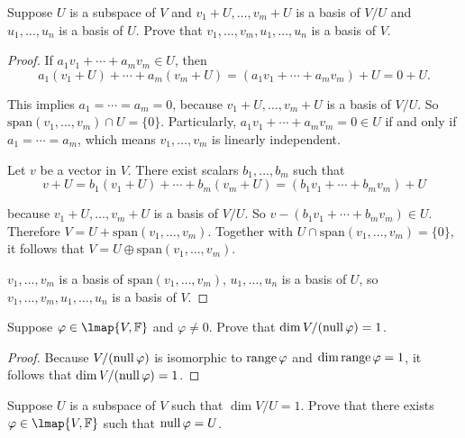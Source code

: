 \begin{exercise}
    Suppose $U$ is a subspace of $V$ and $v_{1} + U, \ldots, v_{m} + U$ is a basis of $V/U$ and $u_{1} , \ldots, u_{n}$ is a basis of $U$. Prove that $v_{1} , \ldots, v_{m} , u_{1} , \ldots, u_{n}$ is a basis of $V$.
\end{exercise}

\begin{proof}
    If $a_{1}v_{1} + \cdots + a_{m}v_{m} \in U$, then
    \[
        a_{1}(v_{1} + U) + \cdots + a_{m}(v_{m} + U) = (a_{1}v_{1} + \cdots + a_{m}v_{m}) + U = 0 + U.
    \]

    This implies $a_{1} = \cdots = a_{m} = 0$, because $v_{1} + U, \ldots, v_{m} + U$ is a basis of $V/U$. So $\text{span}(v_{1}, \ldots, v_{m})\cap U = \{0\}$. Particularly, $a_{1}v_{1} + \cdots + a_{m}v_{m} = 0\in U$ if and only if $a_{1} = \cdots = a_{m}$, which means $v_{1}, \ldots, v_{m}$ is linearly independent.

    Let $v$ be a vector in $V$. There exist scalars $b_{1}, \ldots, b_{m}$ such that
    \[
        v + U = b_{1}(v_{1} + U) + \cdots + b_{m}(v_{m} + U) = (b_{1}v_{1} + \cdots + b_{m}v_{m}) + U
    \]

    because $v_{1} + U, \ldots, v_{m} + U$ is a basis of $V/U$. So $v - (b_{1}v_{1} + \cdots + b_{m}v_{m})\in U$. Therefore $V = U + \text{span}(v_{1}, \ldots, v_{m})$. Together with $U\cap \text{span}(v_{1}, \ldots, v_{m}) = \{0\}$, it follows that $V = U \oplus \text{span}(v_{1}, \ldots, v_{m})$.

    $v_{1}, \ldots, v_{m}$ is a basis of $\text{span}(v_{1}, \ldots, v_{m})$, $u_{1}, \ldots, u_{n}$ is a basis of $U$, so $v_{1} , \ldots, v_{m} , u_{1} , \ldots, u_{n}$ is a basis of $V$.
\end{proof}
\newpage

\begin{exercise}
    Suppose $\varphi \in \lmap{V,\mathbb{F}}$ and $\varphi\ne 0$. Prove that $\dim V/(\text{null}\,{\varphi}) = 1$.
\end{exercise}

\begin{proof}
    Because $V/(\text{null}\,{\varphi})$ is isomorphic to $\text{range}\,{\varphi}$ and $\dim\text{range}\,{\varphi} = 1$, it follows that $\dim V/(\text{null}\,{\varphi}) = 1$.
\end{proof}
\newpage

\begin{exercise}
    Suppose $U$ is a subspace of $V$ such that $\dim V/U = 1$. Prove that there exists $\varphi \in \lmap{V, \mathbb{F}}$ such that $\text{null}\,{\varphi} = U$.
\end{exercise}

